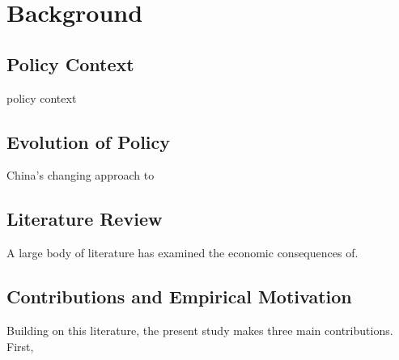 \chapter{Background}\label{background}

\section{Policy Context}\label{policy-context}

policy context

\section{Evolution of
Policy}\label{evolution-of-policy}

China's changing approach to 

\section{Literature Review}\label{literature-review}

A large body of literature has examined the economic consequences of.


\section{Contributions and Empirical
Motivation}\label{contributions-and-empirical-motivation}

Building on this literature, the present study makes three main
contributions. First, 
